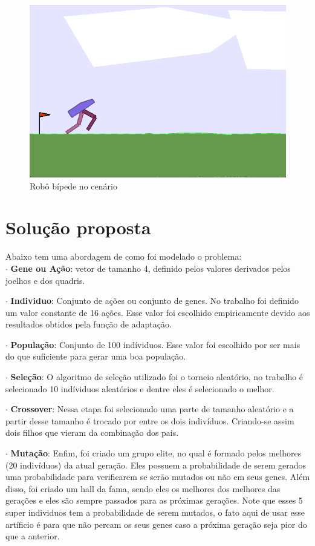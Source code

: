 \documentclass[article, a4paper, 12pt]{article}
\begin{document}
\begin{figure}[!htb]
     \centering
     \includegraphics[scale=0.5]{img/robot_begin.png}
     \caption{Robô bípede no cenário}
     \label{fig:robotbegin}
\end{figure}

\section{Solução proposta}

Abaixo tem uma abordagem de como foi modelado o problema: \\

$\cdot$ \textbf{Gene ou Ação}: vetor de tamanho 4, definido pelos valores derivados pelos joelhos e dos quadris.

$\cdot$ \textbf{Individuo}: Conjunto de ações ou conjunto de genes. No trabalho foi definido um valor constante de 16 ações. Esse valor foi escolhido empiricamente devido aos resultados obtidos pela função de adaptação.

$\cdot$ \textbf{População}: Conjunto de 100 indíviduos. Esse valor foi escolhido por ser mais do que suficiente para gerar uma boa população. 

$\cdot$ \textbf{Seleção}: O algoritmo de seleção utilizado foi o torneio aleatório, no trabalho é selecionado 10 indíviduos aleatórios e dentre eles é selecionado o melhor.

$\cdot$ \textbf{Crossover}: Nessa etapa foi selecionado uma parte de tamanho aleatório e a partir desse tamanho é trocado por entre os dois indivíduos. Criando-se assim dois filhos que vieram da combinação dos pais.

$\cdot$ \textbf{Mutação}: Enfim, foi criado um grupo elite, no qual é formado pelos melhores (20 indivíduos) da atual geração. Eles possuem a probabilidade de serem gerados uma probabilidade para verificarem se serão mutados ou não em seus genes. Além disso, foi criado um hall da fama, sendo eles os melhores dos melhores das gerações e eles são sempre passados para as próximas gerações. Note que esses 5 super individuos tem a probabilidade de serem mutados, o fato aqui de usar esse artíficio é para que não percam os seus genes caso a próxima geração seja pior do que a anterior.
\end{document}
